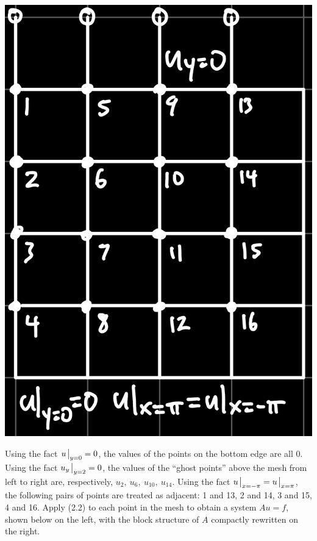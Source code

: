 \documentclass{article}
\begin{document}
\begin{enumerate}
\begin{enumerate}
	\begin{center}
		\includegraphics[scale=.1]{hw6 2 grid}
	\end{center}
	
	Using the fact $u\eval_{y=0}=0$, the values of the points on the bottom edge are all 0. Using the fact $u_y\eval_{y=2}=0$, the values of the ``ghost points'' above the mesh from left to right are, respectively, $u_2,~u_6,~u_{10},~u_{14}$. Using the fact $u\eval_{x=-\pi}=u\eval_{x=\pi}$, the following pairs of points are treated as adjacent: 1 and 13, 2 and 14, 3 and 15, 4 and 16. Apply (2.2) to each point in the mesh to obtain a system $Au=f$, shown below on the left, with the block structure of $A$ compactly rewritten on the right.
	

\end{enumerate}
\end{enumerate}
\end{document}
